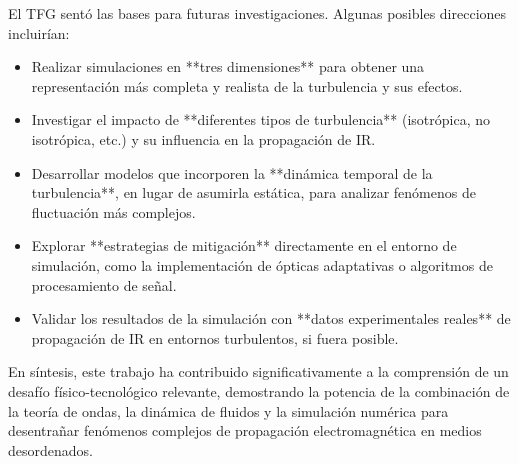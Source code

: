 El TFG sentó las bases para futuras investigaciones. Algunas posibles direcciones incluirían: \begin{itemize}[noitemsep,topsep=0pt] 
    \item Realizar simulaciones en **tres dimensiones** para obtener una representación más completa y realista de la turbulencia y sus efectos. 
    \item Investigar el impacto de **diferentes tipos de turbulencia** (isotrópica, no isotrópica, etc.) y su influencia en la propagación de IR. 
    \item Desarrollar modelos que incorporen la **dinámica temporal de la turbulencia**, en lugar de asumirla estática, para analizar fenómenos de fluctuación más complejos. 
    \item Explorar **estrategias de mitigación** directamente en el entorno de simulación, como la implementación de ópticas adaptativas o algoritmos de procesamiento de señal. 
    \item Validar los resultados de la simulación con **datos experimentales reales** de propagación de IR en entornos turbulentos, si fuera posible. 
\end{itemize} 

En síntesis, este trabajo ha contribuido significativamente a la comprensión de un desafío físico-tecnológico relevante, demostrando la potencia de la combinación de la teoría de ondas, la dinámica de fluidos y la simulación numérica para desentrañar fenómenos complejos de propagación electromagnética en medios desordenados. 

 
